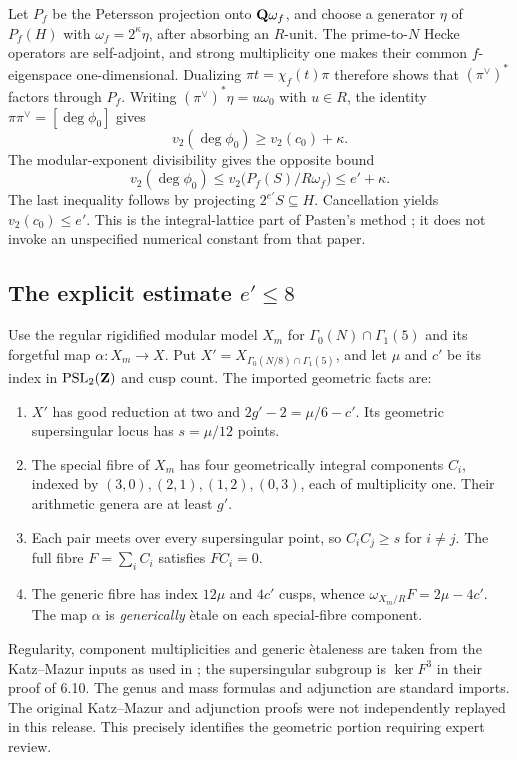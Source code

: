 Let $P_f$ be the Petersson projection onto $\mathbf{Q}\omega_f$, and choose a generator $\eta$ of $P_f(H)$ with $\omega_f=2^\kappa\eta$, after absorbing an $R$-unit. The prime-to-$N$ Hecke operators are self-adjoint, and strong multiplicity one makes their common $f$-eigenspace one-dimensional. Dualizing $\pi t=\chi_f(t)\pi$ therefore shows that $(\pi^\vee)^*$ factors through $P_f$. Writing $(\pi^\vee)^*\eta=u\omega_0$ with $u\in R$, the identity $\pi\pi^\vee=[\deg\phi_0]$ gives
\[
 v_2(\deg\phi_0)\ge v_2(c_0)+\kappa.
\]
The modular-exponent divisibility \cite[Thm.~3.6(a)]{ars} gives the opposite bound
\[
 v_2(\deg\phi_0)\le v_2\bigl(P_f(S)/R\omega_f\bigr)\le e'+\kappa.
\]
The last inequality follows by projecting $2^{e'}S\subseteq H$. Cancellation yields $v_2(c_0)\le e'$. This is the integral-lattice part of Pasten's method \cite[\S10]{pasten}; it does not invoke an unspecified numerical constant from that paper.

\subsection{The explicit estimate $e'\le8$}
Use the regular rigidified modular model $X_m$ for $\Gamma_0(N)\cap\Gamma_1(5)$ and its forgetful map $\alpha:X_m\to X$. Put $X'=X_{\Gamma_0(N/8)\cap\Gamma_1(5)}$, and let $\mu$ and $c'$ be its index in $\mathrm{PSL}_2(\mathbf{Z})$ and cusp count. The imported geometric facts are:
\begin{enumerate}[label=(\roman*)]
\item $X'$ has good reduction at two and $2g'-2=\mu/6-c'$. Its geometric supersingular locus has $s=\mu/12$ points.
\item The special fibre of $X_m$ has four geometrically integral components $C_i$, indexed by $(3,0),(2,1),(1,2),(0,3)$, each of multiplicity one. Their arithmetic genera are at least $g'$.
\item Each pair meets over every supersingular point, so $C_iC_j\ge s$ for $i\ne j$. The full fibre $F=\sum_i C_i$ satisfies $FC_i=0$.
\item The generic fibre has index $12\mu$ and $4c'$ cusps, whence $\omega_{X_m/R}F=2\mu-4c'$. The map $\alpha$ is \emph{generically} \`etale on each special-fibre component.
\end{enumerate}
Regularity, component multiplicities and generic \`etaleness are taken from the Katz--Mazur inputs as used in \cite[\S5.9, Lemmas~5.8, 5.10]{cns}; the supersingular subgroup is $\ker F^3$ in their proof of 6.10. The genus and mass formulas and adjunction are standard imports. The original Katz--Mazur and adjunction proofs were not independently replayed in this release. This precisely identifies the geometric portion requiring expert review.

